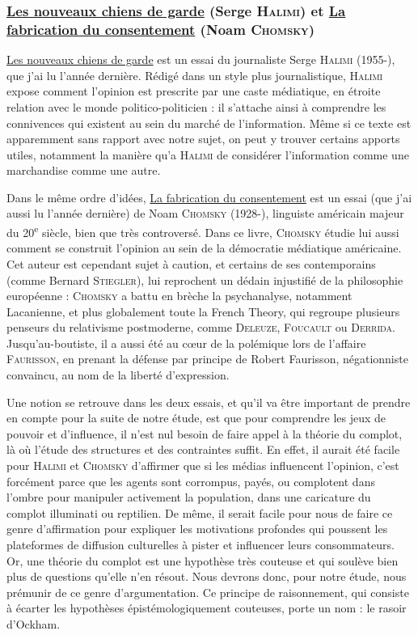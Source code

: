 \documentclass[a4paper,10pt]{article}
\begin{document}
\subsubsection{\underline{Les nouveaux chiens de garde} (Serge \textsc{Halimi}) et \underline{La fabrication du consentement} (Noam \textsc{Chomsky})}

\underline{Les nouveaux chiens de garde} est un essai du journaliste Serge \textsc{Halimi} (1955-), que j'ai lu l'année dernière. Rédigé dans un style plus journalistique, \textsc{Halimi} expose comment l'opinion est prescrite par une caste médiatique, en étroite relation avec le monde politico-politicien : il s'attache ainsi à comprendre les connivences qui existent au sein du marché de l'information. Même si ce texte est apparemment sans rapport avec notre sujet, on peut y trouver certains apports utiles, notamment la manière qu'a \textsc{Halimi} de considérer l'information comme une marchandise comme une autre. 

Dans le même ordre d'idées, \underline{La fabrication du consentement} est un essai (que j'ai aussi lu l'année dernière) de Noam \textsc{Chomsky} (1928-), linguiste américain majeur du 20\textsuperscript{e} siècle, bien que très controversé. Dans ce livre, \textsc{Chomsky} étudie lui aussi comment se construit l'opinion au sein de la démocratie médiatique américaine. Cet auteur est cependant sujet à caution, et certains de ses contemporains (comme Bernard \textsc{Stiegler}), lui reprochent un dédain injustifié de la philosophie européenne : \textsc{Chomsky} a battu en brèche la psychanalyse, notamment Lacanienne, et plus globalement toute la French Theory, qui regroupe plusieurs penseurs du relativisme postmoderne, comme \textsc{Deleuze}, \textsc{Foucault} ou \textsc{Derrida}. Jusqu'au-boutiste, il a aussi été au c\oe{}ur de la polémique lors de l'affaire \textsc{Faurisson}, en prenant la défense par principe de Robert Faurisson, négationniste convaincu, au nom de la liberté d'expression.

Une notion se retrouve dans les deux essais, et qu'il va être important de prendre en compte pour la suite de notre étude, est que pour comprendre les jeux de pouvoir et d'influence, il n'est nul besoin de faire appel à la théorie du complot, là où l'étude des structures et des contraintes suffit. En effet, il aurait été facile pour \textsc{Halimi} et \textsc{Chomsky} d'affirmer que si les médias influencent l'opinion, c'est forcément parce que les agents sont corrompus, payés, ou complotent dans l'ombre pour manipuler activement la population, dans une caricature du complot illuminati ou reptilien. De même, il serait facile pour nous de faire ce genre d'affirmation pour expliquer les motivations profondes qui poussent les plateformes de diffusion culturelles à pister et influencer leurs consommateurs. Or, une théorie du complot est une hypothèse très couteuse et qui soulève bien plus de questions qu'elle n'en résout. Nous devrons donc, pour notre étude, nous prémunir de ce genre d'argumentation. Ce principe de raisonnement, qui consiste à écarter les hypothèses épistémologiquement couteuses, porte un nom : le rasoir d'Ockham.
\end{document}
